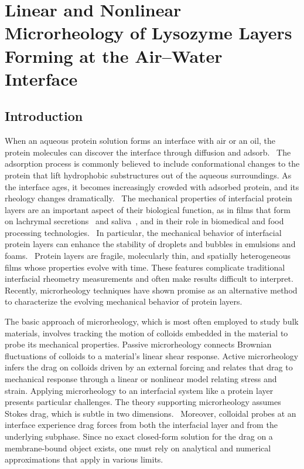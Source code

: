 
\chapter{Linear and Nonlinear Microrheology of Lysozyme Layers Forming at the Air--Water Interface}

\section{\label{sec:introduction}Introduction}

When an aqueous protein solution forms an interface with air or an oil, the protein molecules can discover the interface through diffusion and adsorb.~\cite{Walder2011}  The adsorption process is commonly believed to include conformational changes to the protein that lift hydrophobic substructures out of the aqueous surroundings. As the interface ages, it becomes increasingly crowded with adsorbed protein, and its rheology changes dramatically.~\cite{Murray2011a}
The mechanical properties of interfacial protein layers are an important aspect of their biological function, as in films that form on lachrymal secretions~\cite{Rosenfeld2013} and saliva~\cite{Proctor2005}, and in their role in biomedical and food processing technologies.~\cite{Murray2002}  In particular, the mechanical behavior of interfacial protein layers can enhance the stability of droplets and bubbles in emulsions and foams.~\cite{SaintJalmes2005219,McClements2004305}
Protein layers are fragile, molecularly thin, and spatially heterogeneous films whose properties evolve with time. These features complicate traditional interfacial rheometry measurements and often make results difficult to interpret.  Recently, microrheology techniques have shown promise as an alternative method to characterize the evolving mechanical behavior of protein layers.  

The basic approach of microrheology, which is most often employed to study bulk materials, involves tracking the motion of colloids embedded in the material to probe its mechanical properties.  Passive microrheology connects Brownian fluctuations of colloids to a material's linear shear response. Active microrheology infers the drag on colloids driven by an external forcing and relates that drag to mechanical response through a linear or nonlinear model relating stress and strain.
Applying microrheology to an interfacial system like a protein layer presents particular challenges. The theory supporting microrheology assumes Stokes drag, which is subtle in two dimensions.~\cite{Saffman1975} Moreover, colloidal probes at an interface experience drag forces from both the interfacial layer and from the underlying subphase. Since no exact closed-form solution for the drag on a membrane-bound object exists, one must rely on analytical and numerical approximations that apply in various limits.~\cite{Hughes1982,Fischer2006,Sickert2007,Petrov2008,Levine2004a}

